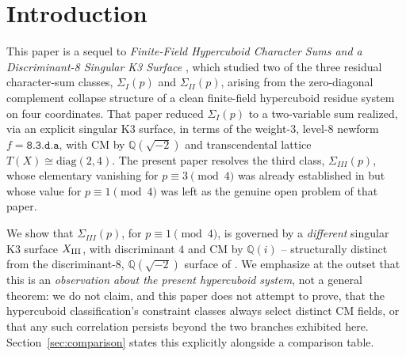 \documentclass[11pt]{amsart}
\theoremstyle{definition}
\newcommand{\Q}{\mathbb{Q}}
\begin{document}
\begin{abstract}
\end{abstract}

\maketitle

\section{Introduction}
\label{sec:intro}

This paper is a sequel to \emph{Finite-Field Hypercuboid Character Sums
and a Discriminant-8 Singular K3 Surface} \cite{ClassesI_II}, which
studied two of the three residual character-sum classes,
$\Sigma_I(p)$ and $\Sigma_{II}(p)$, arising from the zero-diagonal
complement collapse structure of a clean finite-field hypercuboid residue
system on four coordinates. That paper reduced $\Sigma_I(p)$ to a
two-variable sum realized, via an explicit singular K3 surface, in terms
of the weight-$3$, level-$8$ newform $f=\texttt{8.3.d.a}$, with CM by
$\Q(\sqrt{-2})$ and transcendental lattice $T(X)\cong\mathrm{diag}(2,4)$.
The present paper resolves the third class, $\Sigma_{III}(p)$, whose
elementary vanishing for $p\equiv3\pmod4$ was already established in
\cite{ClassesI_II} but whose value for $p\equiv1\pmod4$ was left as the
genuine open problem of that paper.

We show that $\Sigma_{III}(p)$, for $p\equiv1\pmod4$, is governed by a
\emph{different} singular K3 surface $X_{\rm III}$, with discriminant
$4$ and CM by $\Q(i)$ -- structurally distinct from the discriminant-$8$,
$\Q(\sqrt{-2})$ surface of \cite{ClassesI_II}. We emphasize at the outset
that this is an \emph{observation about the present hypercuboid system},
not a general theorem: we do not claim, and this paper does not attempt
to prove, that the hypercuboid classification's constraint classes always
select distinct CM fields, or that any such correlation persists beyond
the two branches exhibited here. Section~\ref{sec:comparison} states this
explicitly alongside a comparison table.
\end{document}
